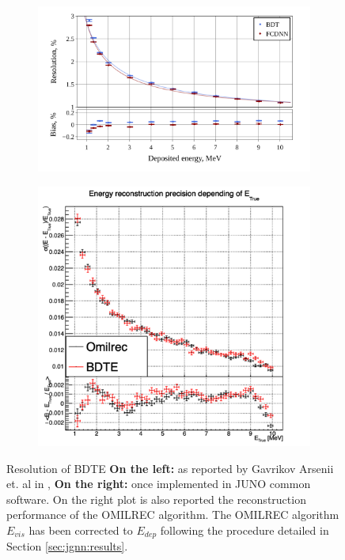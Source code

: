 \documentclass[../main.tex]{subfiles}
\begin{document}
\begin{figure}[ht]
  \centering
  \begin{subfigure}[t]{0.58\linewidth}
    \includegraphics[width=\linewidth]{images/janne/bdte/bdte_perf.png}
    \caption{}
    \label{fig:janne:bdte:orignal_perf}
  \end{subfigure}
  \hfill
  \begin{subfigure}[t]{0.38\linewidth}
    \includegraphics[width=\linewidth]{images/janne/bdte/e_rec_vs_e_true.png}
    \caption{}
    \label{fig:janne:bdte:implementation_perf}
  \end{subfigure}
  \caption{Resolution of BDTE \textbf{On the left: } as reported by Gavrikov Arsenii et. al in \cite{gavrikov_energy_2022}, \textbf{On the right: } once implemented in JUNO common software. On the right plot is also reported the reconstruction performance of the OMILREC algorithm. The OMILREC algorithm $E_{vis}$ has been corrected to $E_{dep}$ following the procedure detailed in Section \ref{sec:jgnn:results}.}
  \label{fig:janne:bdte:perf}
\end{figure}
\end{document}
